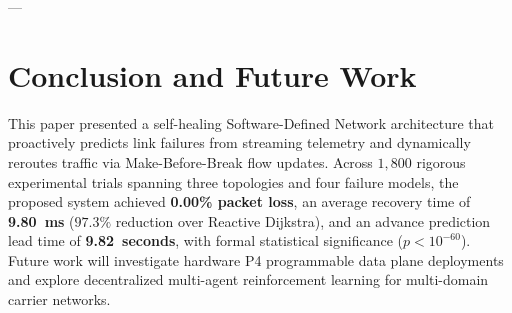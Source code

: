 \documentclass[journal,10pt,twocolumn]{IEEEtran}
\begin{document}
---

\section{Conclusion and Future Work}
\label{sec:conclusion}
This paper presented a self-healing Software-Defined Network architecture that proactively predicts link failures from streaming telemetry and dynamically reroutes traffic via Make-Before-Break flow updates. Across $1{,}800$ rigorous experimental trials spanning three topologies and four failure models, the proposed system achieved \textbf{0.00\% packet loss}, an average recovery time of \textbf{9.80~ms} ($97.3\%$ reduction over Reactive Dijkstra), and an advance prediction lead time of \textbf{9.82~seconds}, with formal statistical significance ($p < 10^{-60}$). Future work will investigate hardware P4 programmable data plane deployments and explore decentralized multi-agent reinforcement learning for multi-domain carrier networks.

\balance


\end{document}
